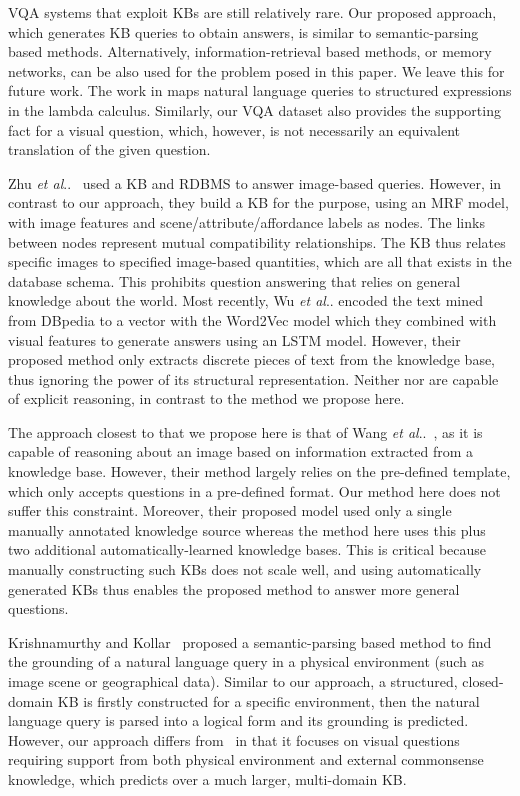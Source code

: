 \documentclass[10pt,journal]{IEEEtran}
\makeatletter
\DeclareRobustCommand\onedot{\futurelet\@let@token\@onedot}
\def\@onedot{\ifx\@let@token.\else.\null\fi\xspace}
\def\etal{\emph{et al}\onedot}
\def\bluett{}
\makeatother
\begin{document}
\bluett{
VQA systems that exploit KBs are still relatively rare.
Our proposed approach, which generates KB queries to obtain answers, is similar to semantic-parsing based methods.  
Alternatively, information-retrieval based methods, or memory networks, can be also used for the problem
posed in this paper. We leave this for future work.
The work in \cite{zettlemoyer2012learning} maps natural language queries to structured expressions in the lambda calculus.
Similarly, our VQA dataset also provides the supporting fact for a visual question, which, however, is not necessarily an equivalent translation of the given question.
}






 Zhu \etal~\cite{zhu2015building} used a KB and RDBMS to answer image-based queries. However, in contrast to our approach, they build a KB for the purpose, using an MRF model, with image features and scene/attribute/affordance labels as nodes. The  links between nodes represent mutual compatibility relationships. The KB thus relates specific images to specified image-based quantities, which are all that exists in the database schema. This prohibits question answering that relies on general knowledge about the world. Most recently, Wu \etal \cite{wu2015ask} encoded the text mined from DBpedia to a vector with the Word2Vec model which they combined with visual features to generate answers using an LSTM model. However, their proposed method only extracts discrete pieces of text from the knowledge base, thus ignoring the power of its structural representation. Neither \cite{zhu2015building} nor \cite{wu2015ask} are capable of explicit reasoning, in contrast to the method we propose here.

The approach closest to that we propose here is that of Wang \etal~\cite{wang2015explicit}, as it is capable of reasoning about an image based on information extracted from a knowledge base. However, their method largely relies on the pre-defined template, which only accepts questions in a pre-defined format. Our method here does not suffer this constraint. Moreover, their proposed model used only a single manually annotated knowledge source whereas the method here uses this plus two additional automatically-learned knowledge bases.
This is critical because manually constructing such KBs does not scale well, and using automatically generated KBs thus enables the proposed method to answer more general questions.

\bluett{
Krishnamurthy and Kollar~\cite{krishnamurthy2013jointly} 
proposed a semantic-parsing based method to find the grounding of a natural language query in a physical environment (such as image scene or geographical data).
Similar to our approach, a structured, closed-domain KB is firstly constructed for a specific environment, 
then the natural language query is parsed into a logical form and its grounding is predicted.
However, our approach differs from~\cite{krishnamurthy2013jointly} in that it focuses on 
visual questions requiring support from both physical environment and external commonsense knowledge,
which predicts over a much larger, multi-domain KB. }
\end{document}
